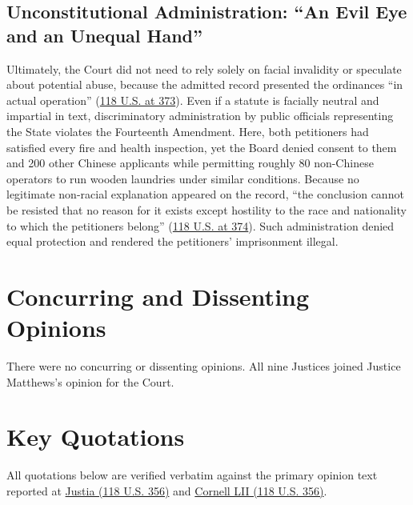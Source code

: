 \documentclass[12pt]{article}
\begin{document}
\subsection{Unconstitutional Administration: ``An Evil Eye and an Unequal Hand''}
Ultimately, the Court did not need to rely solely on facial invalidity or speculate about potential abuse, because the admitted record presented the ordinances ``in actual operation'' (\href{https://supreme.justia.com/cases/federal/us/118/356/}{118 U.S. at 373}). Even if a statute is facially neutral and impartial in text, discriminatory administration by public officials representing the State violates the Fourteenth Amendment. Here, both petitioners had satisfied every fire and health inspection, yet the Board denied consent to them and 200 other Chinese applicants while permitting roughly 80 non-Chinese operators to run wooden laundries under similar conditions. Because no legitimate non-racial explanation appeared on the record, ``the conclusion cannot be resisted that no reason for it exists except hostility to the race and nationality to which the petitioners belong'' (\href{https://supreme.justia.com/cases/federal/us/118/356/}{118 U.S. at 374}). Such administration denied equal protection and rendered the petitioners' imprisonment illegal.

\section{Concurring and Dissenting Opinions}

There were no concurring or dissenting opinions. All nine Justices joined Justice Matthews's opinion for the Court.

\section{Key Quotations}

All quotations below are verified verbatim against the primary opinion text reported at \href{https://supreme.justia.com/cases/federal/us/118/356/}{Justia (118 U.S. 356)} and \href{https://www.law.cornell.edu/supremecourt/text/118/356}{Cornell LII (118 U.S. 356)}.
\end{document}
